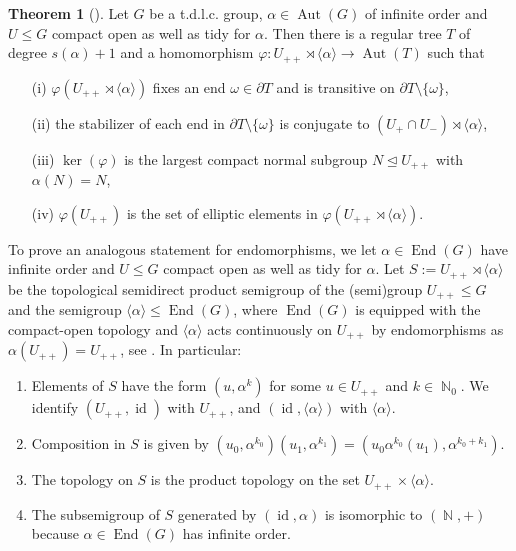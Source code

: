\documentclass{article}
\DeclareMathOperator\End{End}
\DeclareMathOperator\Aut{Aut}
\DeclareMathOperator\id{id}
\DeclareMathOperator\bbN{\mathbb{N}}
\theoremstyle{definition}
\newtheorem{theorem}{Theorem}[section]
\begin{document}
\begin{theorem}[{\cite[Theorem 4.1]{BW04}}]\label{thm:tree_rep_bw}
Let $G$ be a t.d.l.c. group, $\alpha\!\in\!\Aut(G)$ of infinite order and $U\!\le\! G$ compact open as well as tidy for $\alpha$. Then there is a regular tree $T$ of degree $s(\alpha)+1$ and a homomorphism $\varphi:U_{++}\rtimes\langle \alpha\rangle\to \Aut(T)$ such that 
\begin{itemize}
  \item[(i)] $\varphi(U_{++}\rtimes\langle\alpha\rangle)$ fixes an end $\omega\in\partial T$ and is transitive on $\partial T\setminus \{\omega\}$,
  \item[(ii)] the stabilizer of each end in $\partial T\setminus \{\omega\}$ is conjugate to $(U_{+}\cap U_{-})\rtimes \langle \alpha \rangle$,
  \item[(iii)] $\ker(\varphi)$ is the largest compact normal subgroup $N\unlhd U_{++}$ with $\alpha(N)=N$,
  \item[(iv)] $\varphi(U_{++})$ is the set of elliptic elements in $\varphi(U_{++}\rtimes \langle\alpha\rangle)$.
\end{itemize}
\end{theorem}

To prove an analogous statement for endomorphisms, we let $\alpha\in\End(G)$ have infinite order and $U\le G$ compact open as well as tidy for $\alpha$. Let $S:=U_{++}\rtimes\langle\alpha\rangle$ be the topological semidirect product semigroup of the (semi)group $U_{++}\le G$ and the semigroup $\langle\alpha\rangle\le\End(G)$, where $\End(G)$ is equipped with the compact-open topology and $\langle\alpha\rangle$ acts continuously on $U_{++}$ by endomorphisms as $\alpha(U_{++})=U_{++}$, see \cite[Theorem 2.9, Theorem 2.10]{CHK83}. In particular:

\begin{enumerate}
  \item Elements of $S$ have the form $(u,\alpha^{k})$ for some $u\in U_{++}$ and $k\in\bbN_{0}$. We identify $(U_{++},\id)$ with $U_{++}$, and $(\id,\langle\alpha\rangle)$ with $\langle\alpha\rangle$.
  \item Composition in $S$ is given by $(u_0,\alpha^{k_0})(u_1,\alpha^{k_1}) = (u_0\alpha^{k_0}(u_1),\alpha^{k_0+k_1})$.
  \item The topology on $S$ is the product topology on the set $U_{++}\times\langle\alpha\rangle$.
  \item The subsemigroup of $S$ generated by $(\id, \alpha)$ is isomorphic to $(\bbN, +)$ because $\alpha\in\End(G)$ has infinite order.
\end{enumerate}
\end{document}

